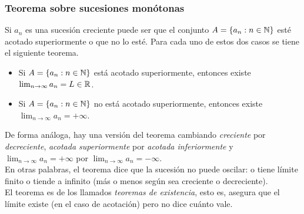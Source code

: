 \documentclass[../Teoría.root.tex]{subfiles}
\begin{document}
\subsubsection{Teorema sobre sucesiones monótonas}
Si \(a_n\) es una sucesión creciente puede ser que el conjunto \(A=\{a_n:n\in\mathbb{N}\}\) esté acotado superiormente o que no lo esté.
Para cada uno de estos dos casos se tiene el siguiente teorema.
\begin{itemize}
    \item Si \(A=\{a_n:n\in\mathbb{N}\}\) está acotado superiormente, entonces existe \(\lim_{n\to\infty}a_n=L\in\mathbb{R}\).
    \item Si \(A=\{a_n:n\in\mathbb{N}\}\) no está acotado superiormente, entonces existe \(\lim_{n\to\infty}a_n=+\infty\).
\end{itemize}
De forma análoga, hay una versión del teorema cambiando \textit{creciente} por \textit{decreciente}, \textit{acotada superiormente} por \textit{acotada inferiormente} y \(\lim_{n\to\infty}a_n=+\infty\) por \(\lim_{n\to\infty}a_n=-\infty\).\\
En otras palabras, el teorema dice que la sucesión no puede oscilar:
o tiene límite finito o tiende a infinito (más o menos según sea creciente o decreciente).\\
El teorema es de los llamados \textit{teoremas de existencia}, esto es, asegura que el límite existe (en el caso de acotación) pero no dice cuánto vale.\\
\end{document}
